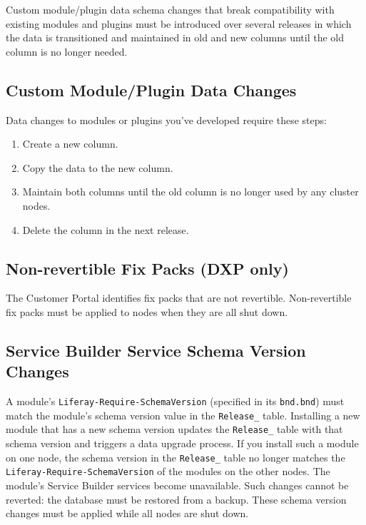 Custom module/plugin data schema changes that break compatibility with
existing modules and plugins must be introduced over several releases in
which the data is transitioned and maintained in old and new columns
until the old column is no longer needed.

\subsection{Custom Module/Plugin Data
Changes}\label{custom-moduleplugin-data-changes}

Data changes to modules or plugins you've developed require these steps:

\begin{enumerate}
\def\labelenumi{\arabic{enumi}.}
\item
  Create a new column.
\item
  Copy the data to the new column.
\item
  Maintain both columns until the old column is no longer used by any
  cluster nodes.
\item
  Delete the column in the next release.
\end{enumerate}

\subsection{Non-revertible Fix Packs (DXP
only)}\label{non-revertible-fix-packs-dxp-only}

The Customer Portal identifies fix packs that are not revertible.
Non-revertible fix packs must be applied to nodes when they are all shut
down.

\subsection{Service Builder Service Schema Version
Changes}\label{service-builder-service-schema-version-changes}

A module's \texttt{Liferay-Require-SchemaVersion} (specified in its
\texttt{bnd.bnd}) must match the module's schema version value in the
\texttt{Release\_} table. Installing a new module that has a new schema
version updates the \texttt{Release\_} table with that schema version
and triggers a data upgrade process. If you install such a module on one
node, the schema version in the \texttt{Release\_} table no longer
matches the \texttt{Liferay-Require-SchemaVersion} of the modules on the
other nodes. The module's Service Builder services become unavailable.
Such changes cannot be reverted: the database must be restored from a
backup. These schema version changes must be applied while all nodes are
shut down.

